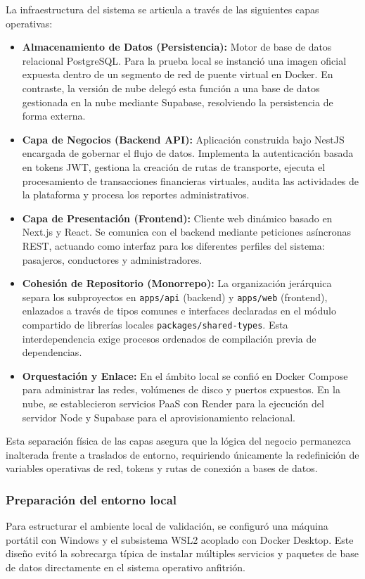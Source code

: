 \documentclass{article}
\begin{document}
La infraestructura del sistema se articula a través de las siguientes capas operativas:
\begin{itemize}[leftmargin=*]
    \item \textbf{Almacenamiento de Datos (Persistencia):} Motor de base de datos relacional PostgreSQL. Para la prueba local se instanció una imagen oficial expuesta dentro de un segmento de red de puente virtual en Docker. En contraste, la versión de nube delegó esta función a una base de datos gestionada en la nube mediante Supabase, resolviendo la persistencia de forma externa.
    \item \textbf{Capa de Negocios (Backend API):} Aplicación construida bajo NestJS encargada de gobernar el flujo de datos. Implementa la autenticación basada en tokens JWT, gestiona la creación de rutas de transporte, ejecuta el procesamiento de transacciones financieras virtuales, audita las actividades de la plataforma y procesa los reportes administrativos.
    \item \textbf{Capa de Presentación (Frontend):} Cliente web dinámico basado en Next.js y React. Se comunica con el backend mediante peticiones asíncronas REST, actuando como interfaz para los diferentes perfiles del sistema: pasajeros, conductores y administradores.
    \item \textbf{Cohesión de Repositorio (Monorrepo):} La organización jerárquica separa los subproyectos en \texttt{apps/api} (backend) y \texttt{apps/web} (frontend), enlazados a través de tipos comunes e interfaces declaradas en el módulo compartido de librerías locales \texttt{packages/shared-types}. Esta interdependencia exige procesos ordenados de compilación previa de dependencias.
    \item \textbf{Orquestación y Enlace:} En el ámbito local se confió en Docker Compose para administrar las redes, volúmenes de disco y puertos expuestos. En la nube, se establecieron servicios PaaS con Render para la ejecución del servidor Node y Supabase para el aprovisionamiento relacional.
\end{itemize}

Esta separación física de las capas asegura que la lógica del negocio permanezca inalterada frente a traslados de entorno, requiriendo únicamente la redefinición de variables operativas de red, tokens y rutas de conexión a bases de datos.

\subsubsection{Preparación del entorno local}
Para estructurar el ambiente local de validación, se configuró una máquina portátil con Windows y el subsistema WSL2 acoplado con Docker Desktop. Este diseño evitó la sobrecarga típica de instalar múltiples servicios y paquetes de base de datos directamente en el sistema operativo anfitrión.
\end{document}
